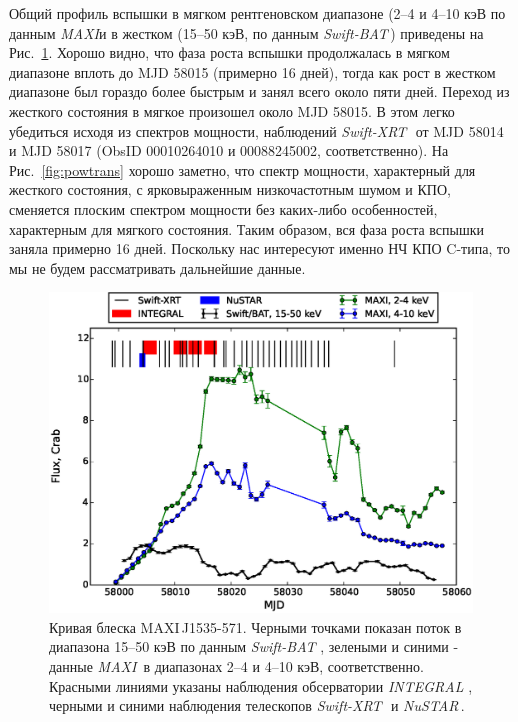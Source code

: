 \documentclass{pazhb}
\def\maxisrc{MAXI\,J1535-571}
\def\maxi{{\em MAXI}}
\def\swiftx{{\em Swift-XRT\,}}
\def\swiftb{{\em Swift-BAT\,}}
\def\nustar{{\em NuSTAR\,}}
\def\integral{{\em INTEGRAL\,}}
\begin{document}
Общий профиль вспышки в мягком рентгеновском диапазоне (2--4 и 4--10 кэВ по данным \maxi и в жестком (15--50 кэВ, по данным \swiftb) приведены на Рис.~\ref{fig:lc}. Хорошо видно, что фаза роста вспышки продолжалась в мягком диапазоне вплоть до MJD 58015 (примерно 16 дней), тогда как рост в жестком диапазоне был гораздо более быстрым и занял всего около пяти дней. Переход из жесткого состояния в мягкое произошел около MJD 58015. В этом легко убедиться исходя из спектров мощности, наблюдений \swiftx\, от MJD 58014 и MJD 58017 (ObsID 00010264010 и 00088245002, соответственно). На Рис.~\ref{fig:powtrans} хорошо заметно, что спектр мощности, характерный для жесткого состояния, с ярковыраженным низкочастотным шумом и КПО, сменяется плоским спектром мощности без каких-либо особенностей, характерным для мягкого состояния.
Таким образом, вся фаза роста вспышки заняла примерно 16 дней. Поскольку нас интересуют именно НЧ КПО C-типа, то мы не будем рассматривать дальнейшие данные.

\begin{figure}
\centerline{\includegraphics[scale=0.75]{overall_lc_v02.eps}}
\caption{Кривая блеска \maxisrc. Черными точками показан поток в диапазона 15--50 кэВ по данным \swiftb\,, зелеными и синими - данные \maxi\, в диапазонах 2--4 и 4--10 кэВ, соответственно. Красными линиями указаны наблюдения обсерватории \integral\,, черными и синими наблюдения телескопов \swiftx\, и \nustar. }
\label{fig:lc}
\end{figure} 
\end{document}
